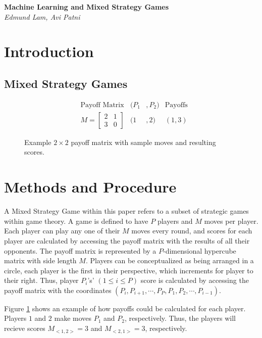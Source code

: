 \documentclass{article}
\begin{document}
\begin{titlepage}
	\begin{center}
		\Large\textbf{Machine Learning and Mixed Strategy Games}\\
		\large\textit{Edmund Lam, Avi Patni}
	\end{center}
\end{titlepage}

\section{Introduction}
\subsection{Mixed Strategy Games}

\begin{figure}[b]
  \caption{Example $2\times2$ payoff matrix with sample moves and resulting scores.}
  	\begin{align*}
  	&\text{Payoff Matrix} &(P_1&,P_2) &\text{Payoffs}\\
	  &M=
	  \begin{bmatrix}
		  2 & 1\\
		  3 & 0
	  \end{bmatrix}
	  &(1&,2)
	  &(1,3)
	  \end{align*}
  \label{fig:1}
\end{figure}

\section{Methods and Procedure}

A Mixed Strategy Game within this paper refers to a subset of strategic games within game theory. A game is defined to have $P$ players and $M$ moves per player. Each player can play any one of their $M$ moves every round, and scores for each player are calculated by accessing the payoff matrix with the results of all their opponents. The payoff matrix is represented by a $P$-dimensional hypercube matrix with side length $M$. Players can be conceptualized as being arranged in a circle, each player is the first in their perspective, which increments for player to their right. Thus, player $P_i$'s' $(1\leq i\leq P)$ score is calculated by accessing the payoff matrix with the coordinates $(P_i, P_{i+1}, \cdots , P_P, P_1, P_2, \cdots , P_{i-1})$.

Figure \ref{fig:1} shows an example of how payoffs could be calculated for each player. Players $1$ and $2$ make moves $P_1$ and $P_2$, respectively. Thus, the players will recieve scores $M_{<1,2>}=3$ and $M_{<2,1>}=3$, respectively.
\end{document}
